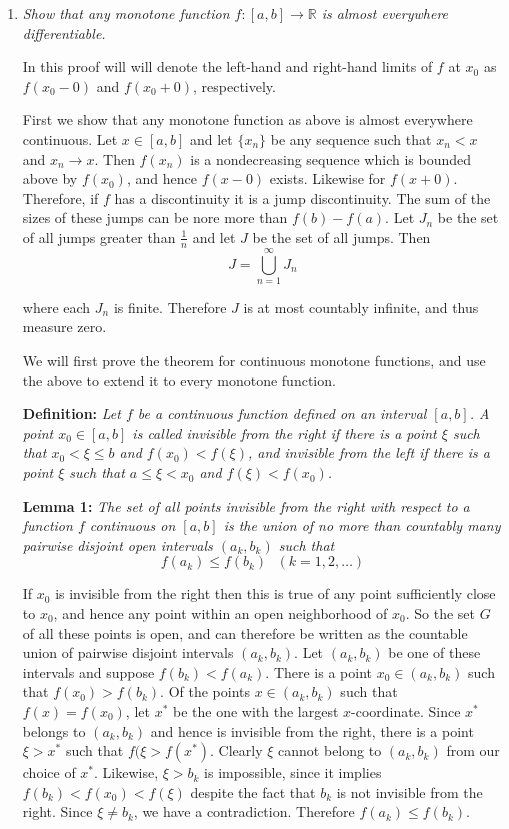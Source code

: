 \documentclass[11pt]{article}
\begin{document}
\begin{enumerate}
\item \emph{Show that any monotone function $f: [a,b] \rightarrow \mathbb{R}$ is almost everywhere differentiable.}

In this proof will will denote the left-hand and right-hand limits of $f$ at $x_0$ as $f(x_0-0)$ and $f(x_0+0)$, respectively.

First we show that any monotone function as above is almost everywhere continuous.  Let $x \in [a,b]$ and let $\{x_n\}$ be any sequence such that $x_n < x$ and $x_n \rightarrow x$.  Then ${f(x_n)}$ is a nondecreasing sequence which is bounded above by $f(x_0)$, and hence $f(x-0)$ exists.  Likewise for $f(x+0)$.  Therefore, if $f$ has a discontinuity it is a jump discontinuity.  The sum of the sizes of these jumps can be nore more than $f(b)-f(a)$.  Let $J_n$ be the set of all jumps greater than $\frac{1}{n}$ and let $J$ be the set of all jumps.  Then
\[
J = \bigcup_{n=1}^\infty J_n
\]

where each $J_n$ is finite.  Therefore $J$ is at most countably infinite, and thus measure zero.

We will first prove the theorem for continuous monotone functions, and use the above to extend it to every monotone function.

\textbf{Definition:} \emph{Let $f$ be a continuous function defined on an interval $[a,b]$.  A point $x_0 \in [a,b]$ is called \emph{invisible from the right} if there is a point $\xi$ such that $x_0 < \xi \leq b$ and $f(x_0) < f(\xi)$, and \emph{invisible from the left} if there is a point $\xi$ such that $a \leq \xi < x_0$ and $f(\xi) < f(x_0)$.}

\textbf{Lemma 1:} \emph{The set of all points invisible from the right with respect to a function $f$ continuous on $[a,b]$ is the union of no more than countably many pairwise disjoint open intervals $(a_k,b_k)$ such that
\begin{equation}
\label{lem1}
f(a_k) \leq f(b_k) \,\,\,\,(k=1,2,\ldots)
\end{equation}}

If $x_0$ is invisible from the right then this is true of any point sufficiently close to $x_0$, and hence any point within an open neighborhood of $x_0$.  So the set $G$ of all these points is open, and can therefore be written as the countable union of pairwise disjoint intervals $(a_k,b_k)$.  Let $(a_k,b_k)$ be one of these intervals and suppose $f(b_k) < f(a_k)$.  There is a point $x_0 \in (a_k,b_k)$ such that $f(x_0) > f(b_k)$.  Of the points $x \in (a_k,b_k)$ such that $f(x) = f(x_0)$, let $x^\ast$ be the one with the largest $x$-coordinate.  Since $x^\ast$ belongs to $(a_k,b_k)$ and hence is invisible from the right, there is a point $\xi > x^\ast$ such that $f(\xi > f(x^\ast)$.  Clearly $\xi$ cannot belong to $(a_k,b_k)$ from our choice of $x^\ast$.  Likewise, $\xi > b_k$ is impossible, since it implies $f(b_k) < f(x_0) < f(\xi)$ despite the fact that $b_k$ is not invisible from the right.  Since $\xi \neq b_k$, we have a contradiction.  Therefore $f(a_k) \leq f(b_k)$.


\end{enumerate}
\end{document}
